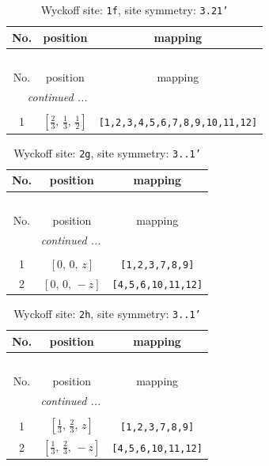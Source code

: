 \documentclass[fleqn,8pt]{jsarticle}
\begin{document}
\renewcommand{\arraystretch}{1.2}
\begin{longtable}{ccc}
\caption{Wyckoff site: {\tt 1f}, site symmetry: {\tt 3.21'}}
 \\
 \hline \hline
No. & position & mapping \\ \hline \endfirsthead

\multicolumn{2}{l}{\tablename\ \thetable{}} \\
 \hline \hline
No. & position & mapping \\ \hline \endhead

 \hline \hline
\multicolumn{2}{r}{\footnotesize\it continued ...} \\ \endfoot

 \hline \hline
\multicolumn{2}{r}{} \\ \endlastfoot

1 & $\left[ \frac{2}{3},\, \frac{1}{3},\, \frac{1}{2} \right]$ & {\tt [1,2,3,4,5,6,7,8,9,10,11,12]} \\
\end{longtable}
\renewcommand{\arraystretch}{1.2}
\begin{longtable}{ccc}
\caption{Wyckoff site: {\tt 2g}, site symmetry: {\tt 3..1'}}
 \\
 \hline \hline
No. & position & mapping \\ \hline \endfirsthead

\multicolumn{2}{l}{\tablename\ \thetable{}} \\
 \hline \hline
No. & position & mapping \\ \hline \endhead

 \hline \hline
\multicolumn{2}{r}{\footnotesize\it continued ...} \\ \endfoot

 \hline \hline
\multicolumn{2}{r}{} \\ \endlastfoot

1 & $\left[ 0,\, 0,\, z \right]$ & {\tt [1,2,3,7,8,9]} \\ \hline
2 & $\left[ 0,\, 0,\, - z \right]$ & {\tt [4,5,6,10,11,12]} \\
\end{longtable}
\renewcommand{\arraystretch}{1.2}
\begin{longtable}{ccc}
\caption{Wyckoff site: {\tt 2h}, site symmetry: {\tt 3..1'}}
 \\
 \hline \hline
No. & position & mapping \\ \hline \endfirsthead

\multicolumn{2}{l}{\tablename\ \thetable{}} \\
 \hline \hline
No. & position & mapping \\ \hline \endhead

 \hline \hline
\multicolumn{2}{r}{\footnotesize\it continued ...} \\ \endfoot

 \hline \hline
\multicolumn{2}{r}{} \\ \endlastfoot

1 & $\left[ \frac{1}{3},\, \frac{2}{3},\, z \right]$ & {\tt [1,2,3,7,8,9]} \\ \hline
2 & $\left[ \frac{1}{3},\, \frac{2}{3},\, - z \right]$ & {\tt [4,5,6,10,11,12]} \\
\end{longtable}
\end{document}

